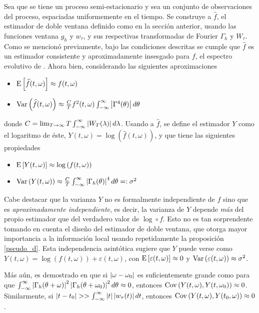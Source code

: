 Sea \xt que se tiene un proceso semi-estacionario y sea \xtd un conjunto de observaciones del 
proceso, espaciadas uniformemente en el tiempo.
Se construye a $\widehat{f}$, el estimador de doble ventana definido como en la sección anterior,
usando las funciones ventana $g_h$ y $w_\tau$, y sus respectivas transformadas de Fourier 
$\Gamma_h$ y $W_\tau$. Como se mencionó previamente, bajo las condiciones descritas se cumple que 
$\widehat{f}$ es un estimador consistente y aproximadamente insesgado para $f$, el espectro
evolutivo de \xt. Ahora bien, considerando las siguientes aproximaciones
%
\begin{itemize}
\item $\mathrm{E}\left[ \widehat{f}(t,\omega) \right] \approx f(t,\omega)$
\item $\mathrm{Var}\left( \widehat{f}(t,\omega) \right) \approx 
\frac{C}{T} f^{2}(t,\omega) \int_{-\infty}^{\infty} \left| \Gamma^{4}(\theta) \right| d\theta$
\end{itemize}
%
donde $C = \lim_{T\rightarrow \infty} T \int_{-\infty}^{\infty} \left| W_T(\lambda) \right| d\lambda$.
Usando a $\widehat{f}$, se define el estimador $Y$ como el logaritmo de éste, 
$Y(t,\omega) = \log\left(\widehat{f}(t,\omega)\right)$, y que tiene las siguientes propiedades
%
\begin{itemize}
\item $\mathrm{E}\left[ Y(t,\omega) \right] \approx \log\left(f(t,\omega)\right)$
\item $\mathrm{Var}\left( Y(t,\omega) \right) \approx 
\frac{C}{T} \int_{-\infty}^{\infty} \left| \Gamma_h(\theta) \right|^{4} d\theta =: \sigma^{2}$
\end{itemize}
%

Cabe destacar que la varianza $Y$ no es formalmente independiente de $f$ sino que es 
\textit{aproximadamente independiente}, es decir, la varianza de $Y$ depende \textit{más} 
del propio estimador que del verdadero valor de $\log\circ f$.
Esto no es tan sorprendente tomando en cuenta el diseño del estimador de doble ventana, que otorga 
mayor importancia a la información local usando repetidamente la proposición \ref{pseudo_d}. Esta 
independencia asintótica sugiere que $Y$ puede verse como
%
$Y(t,\omega) = \log\left(f(t,\omega) \right) + \varepsilon(t,\omega)$,
%
con $\mathrm{E}\left[ \varepsilon(t,\omega) \right] \approx 0$ y $\mathrm{Var}\left( \varepsilon(t,\omega) \right) \approx \sigma^{2}$.

Más aún, es demostrado en \cite{Priestley66} que si $\left| \omega-\omega_0 \right|$ es suficientemente 
grande como para que 
$\int_{-\infty}^{\infty} \left| \Gamma_h(\theta+\omega) \right|^{2}\left| \Gamma_h(\theta+\omega_0) \right|^{2} d\theta \approx 0$,
entonces 
%
$\mathrm{Cov}\left( Y(t,\omega),Y(t,\omega_0) \right) \approx 0$.
%
Similarmente, si $\left| t-t_0 \right| >> \int_{-\infty}^{\infty} \left| t \right| \left| w_\tau (t) \right| dt $, entonces
%
$\mathrm{Cov}\left( Y(t,\omega),Y(t_0,\omega) \right) \approx 0$.


